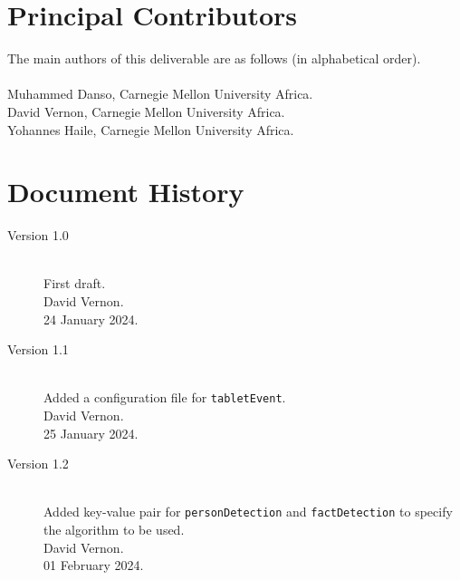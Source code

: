 \documentclass{CSSRforAfrica}
\newcommand{\blank}{~\\}
\begin{document}
{\newpage




\pagebreak
\section*{Principal Contributors}
\label{contributors}
The main authors of this deliverable are as follows (in alphabetical order).
\blank
~
\blank
Muhammed Danso, Carnegie Mellon University Africa.\\   
David Vernon, Carnegie Mellon University Africa.\\   
Yohannes Haile, Carnegie Mellon University Africa.\\

\newpage
\section*{Document History}
\label{document_history}

\begin{description}

\item [Version 1.0]~\\
First draft. \\
David Vernon. \\                          
24 January 2024.

\item [Version 1.1]~\\
Added a configuration file for {\small \verb+tabletEvent+}.\\
David Vernon. \\                          
25 January 2024.

\item [Version 1.2]~\\
Added key-value pair for {\small \verb+personDetection+} and {\small \verb+factDetection+} to specify the algorithm to be used.\\
David Vernon. \\                          
01  February 2024.


\end{description}}
\end{document}
